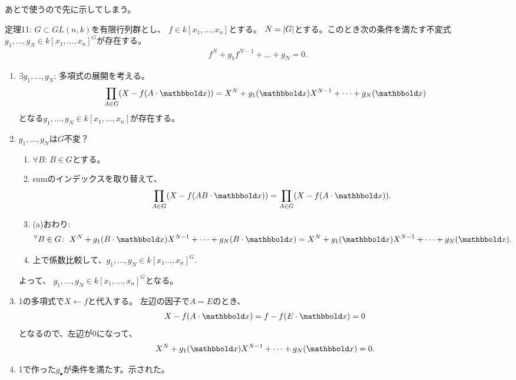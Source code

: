 あとで使うので先に示してしまう。
\begin{framed}
  定理11:
  $G\subset GL(n,k)$を有限行列群とし、
  $f\in k[x_1,\dots,x_n]$とする。
  $N=\left|G\right|$とする。このとき次の条件を満たす不変式
  $g_1,\dots,g_N \in k[x_1,\dots,x_n]^G$が存在する。
  \begin{align}
    f^N + g_1 f^{N-1} + \dots + g_N = 0.
  \end{align}
\end{framed}
\begin{myproof}
  \begin{enumerate}
    \item $\exists g_1,\dots,g_N$: 多項式の展開を考える。
    \begin{align}
      \prod_{A\in G} (X-f(A\cdot \bbold x))
      =
      X^N + g_1(\bbold x)X^{N-1} + \dots + g_N(\bbold x)
    \end{align}
    となる$g_1,\dots,g_N \in k[x_1,\dots,x_n]$が存在する。
    \item
    $g_1,\dots,g_N$は$G$不変？
    \begin{enumerate}
      \item $\forall B$: $B\in G$とする。
      \item sumのインデックスを取り替えて、
      \begin{align}
        \prod_{A\in G}(X-f(AB\cdot \bbold x)) = \prod_{A\in G}(X-f(A\cdot \bbold x)).
      \end{align}
      \item (a)おわり:
      \begin{align}
        \Forall{B\in G}
        X^N + g_1(B\cdot \bbold x)X^{N-1} + \dots + g_N(B\cdot \bbold x)
        =
        X^N + g_1(\bbold x) X^{N-1} + \dots + g_N(\bbold x).
      \end{align}
      \item
      上で係数比較して、$g_1,\dots,g_N \in k[x_1\dots,x_n]^G$.
    \end{enumerate}
    よって、
    $g_1,\dots,g_N \in k[x_1,\dots,x_n]^G$となる。
    \item
    1の多項式で$X\leftarrow f$と代入する。
    左辺の因子で$A = E$のとき、
    \begin{align}
      X - f(A\cdot \bbold x)
      =
      f - f(E\cdot \bbold x) = 0
    \end{align}
    となるので、左辺が0になって、
    \begin{align}
      X^N + g_1(\bbold x)X^{N-1} + \dots + g_N(\bbold x)  = 0.
    \end{align}
    \item
    1で作った$g_\bullet$が条件を満たす。示された。
  \end{enumerate}
\end{myproof}

